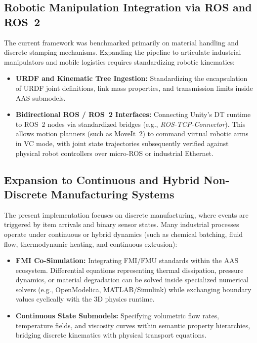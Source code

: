 \subsection{Robotic Manipulation Integration via \texorpdfstring{\gls{ROS}}{ROS} and \texorpdfstring{\gls{ROS}}{ROS}~2}
The current framework was benchmarked primarily on material handling and discrete stamping mechanisms. Expanding the pipeline to articulate industrial manipulators and mobile logistics requires standardizing robotic kinematics:
\begin{itemize}
    \item \textbf{\gls{URDF} and Kinematic Tree Ingestion:} Standardizing the encapsulation of \gls{URDF} joint definitions, link mass properties, and transmission limits inside \gls{AAS} submodels.
    \item \textbf{Bidirectional \gls{ROS} / \gls{ROS}~2 Interfaces:} Connecting Unity's \gls{DT} runtime to \gls{ROS}~2 nodes via standardized bridges (e.g., \textit{ROS-TCP-Connector}). This allows motion planners (such as MoveIt~2) to command virtual robotic arms in \gls{VC} mode, with joint state trajectories subsequently verified against physical robot controllers over micro-\gls{ROS} or industrial Ethernet.
\end{itemize}

\subsection{Expansion to Continuous and Hybrid Non-Discrete Manufacturing Systems}
The present implementation focuses on discrete manufacturing, where events are triggered by item arrivals and binary sensor states. Many industrial processes operate under continuous or hybrid dynamics (such as chemical batching, fluid flow, thermodynamic heating, and continuous extrusion):
\begin{itemize}
    \item \textbf{\gls{FMI} Co-Simulation:} Integrating \gls{FMI}/\gls{FMU} standards within the \gls{AAS} ecosystem. Differential equations representing thermal dissipation, pressure dynamics, or material degradation can be solved inside specialized numerical solvers (e.g., OpenModelica, MATLAB/Simulink) while exchanging boundary values cyclically with the 3D physics runtime.
    \item \textbf{Continuous State Submodels:} Specifying volumetric flow rates, temperature fields, and viscosity curves within semantic property hierarchies, bridging discrete kinematics with physical transport equations.
\end{itemize}

